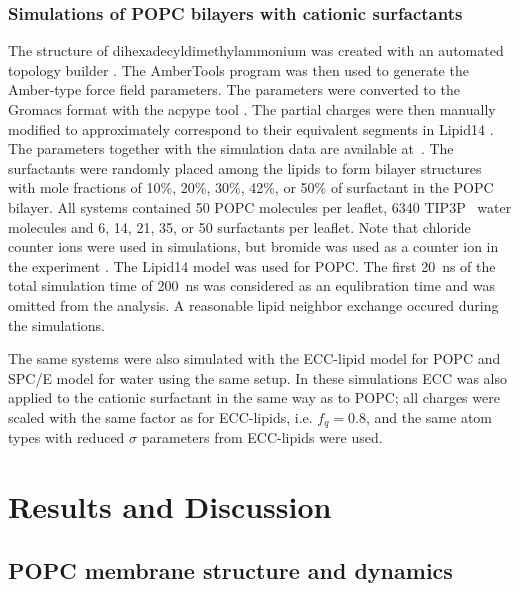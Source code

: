 \documentclass[aip,jcp,twocolumn]{revtex4}
\begin{document}
\subsubsection{Simulations of POPC bilayers with cationic surfactants}
The structure of dihexadecyldimethylammonium
was created with an automated topology builder \cite{malde11}. 
The AmberTools program \cite{amber} was then used to generate the Amber-type force field
parameters. The parameters were converted to the Gromacs format with
the acpype tool \cite{acpype}. The partial charges were then manually modified
to approximately correspond to their equivalent segments in Lipid14 \cite{dickson14}.
The parameters together with the simulation data are available
at~\cite{POPClipid14T313K,POPClipid1410perCATsurfT313K,POPClipid1420perCATsurfT313K,POPClipid1430perCATsurfT313K,POPClipid1442perCATsurfT313K,POPClipid1450perCATsurfT313K}.
The surfactants were randomly placed among the lipids to form bilayer structures with
mole fractions of 10\%, 20\%, 30\%, 42\%, or 50\% of surfactant in the POPC bilayer.
All systems contained 50 POPC molecules per leaflet, 6340 TIP3P~\cite{jorgensen83} water molecules and
6, 14, 21, 35, or 50 surfactants per leaflet. 
Note that chloride counter ions were used in simulations, 
but bromide was used as a counter ion in the experiment \cite{scherer89}.
The Lipid14 model was used for POPC.
The first 20~ns of the total simulation time of 200~ns
was considered as an equlibration time and was omitted from the analysis.
A reasonable lipid neighbor exchange occured during the simulations.


The same systems were also simulated with the ECC-lipid model for POPC 
and SPC/E model for water using the same setup.
In these simulations ECC was also applied to the cationic surfactant 
in the same way as to POPC;
all charges were scaled with the same factor as for ECC-lipids, i.e. $f_q=0.8$, 
and the same atom types with reduced $\sigma$ parameters from ECC-lipids were used. 

\section{Results and Discussion}

\subsection{POPC membrane structure and dynamics}
\end{document}
